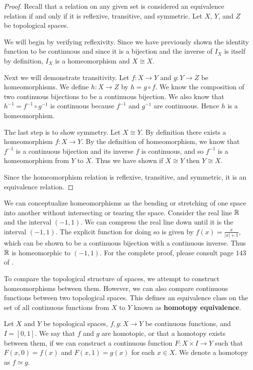 \begin{proof}
Recall that a relation on any given set is considered an equivalence relation if and only if it is reflexive, transitive, and symmetric. Let $X$, $Y$, and $Z$ be topological spaces.

We will begin by verifying reflexivity. Since we have previously shown the identity function to be continuous and since it is a bijection and the inverse of $I_X$ is itself by definition, $I_X$ is a homeomorphism and $X\cong X$. 

Next we will demonstrate transitivity. Let  $f\colon X\rightarrow Y $ and $g\colon Y\rightarrow Z$ be homeomorphisms. We define $h\colon X\rightarrow Z$ by $h=g\circ f$. We know the composition of two continuous bijections to be a continuous bijection. We also know that $h^{-1}=f^{-1}\circ g^{-1}$ is continuous because $f^{-1}$ and $g^{-1}$ are continuous. Hence $h$ is a homeomorphism.

The last step is to show symmetry. Let $X\cong Y$. By definition there exists a homeomorphism $f\colon X \rightarrow Y$. By the definition of homeomorphism, we know that $f^{-1}$ is a continuous bijection and its inverse $f$ is continuous, and so $f^{-1}$ is a homeomorphism from $Y$ to $X$. Thus we have shown if $X\cong Y$ then $Y\cong X$.

Since the homeomorphism relation is reflexive, transitive, and symmetric, it is an equivalence relation.
\end{proof}

We can conceptualize homeomorphisms as the bending or stretching of one space into another without intersecting or tearing the space. Consider the real line $\mathbb{R}$ and the interval $(-1,1)$. We can compress the real line down until it is the interval $(-1,1)$. The explicit function for doing so is given by $f(x)=\frac{x}{|x|+1}$, which can be shown to be a continuous bijection with a continuous inverse. Thus $\mathbb{R}$ is homeomorphic to $(-1,1)$. For the complete proof, please consult page $143$ of \cite{top}. 

To compare the topological structure of spaces, we attempt to construct homeomorphisms between them. However, we can also compare continuous functions between two topological spaces. This defines an equivalence class on the set of all continuous functions from $X$ to $Y$ known as \textbf{homotopy equivalence}.


\begin{defn}
Let $X$ and $Y$ be topological spaces, $f,g\colon X \rightarrow Y$ be continuous functions, and $I=[0,1]$. We say that $f$ and $g$ are homotopic, or that a homotopy exists between them, if we can construct a continuous function $F\colon X \times I \rightarrow Y$ such that $F(x,0)=f(x)$ and $F(x,1)=g(x)$ for each $x \in X$. We denote a homotopy as $f \simeq g$.
\end{defn}

